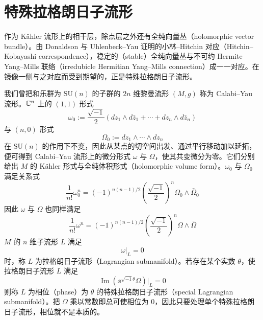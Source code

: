 \section{特殊拉格朗日子流形}

作为 Kähler 流形上的相干层，除点层之外还有全纯向量丛（holomorphic vector bundle）。由 Donaldson 与 Uhlenbeck--Yau 证明的小林--Hitchin 对应（Hitchin--Kobayashi correspondence），稳定的（stable）全纯向量丛与不可约 Hermite Yang--Mills 联络（irredubicle Hermitian Yang--Mills connection）成一一对应。在镜像一侧与之对应而受到期望的，正是特殊拉格朗日子流形。


我们曾把和乐群为 $\mathrm{SU}(n)$ 的子群的 $2n$ 维黎曼流形 $(M, g)$ 称为 Calabi--Yau 流形。$\mathbb{C}^n$ 上的 $(1, 1)$ 形式
\begin{equation}
\omega_0 := \frac{\sqrt{-1}}{2}\left(dz_1 \wedge d\bar z_1 + \cdots + dz_n \wedge d\bar z_n\right) \tag{20.1}
\end{equation}
与 $(n, 0)$ 形式
\begin{equation}
\Omega_0 := dz_1 \wedge \cdots \wedge dz_n \tag{20.2}
\end{equation}
在 $\mathrm{SU}(n)$ 的作用下不变，因此从某点的切空间出发、通过平行移动加以延拓，便可得到 Calabi--Yau 流形上的微分形式 $\omega$ 与 $\Omega$，使其共变微分为零。它们分别给出 $M$ 的 Kähler 形式与全纯体积形式（holomorphic volume form）。$\omega_0$ 与 $\Omega_0$ 满足关系式
\begin{equation}
\frac{1}{n!}\omega_0^{n} = (-1)^{n(n-1)/2}\left(\frac{\sqrt{-1}}{2}\right)^{n}\Omega_0 \wedge \bar\Omega_0 \tag{20.3}
\end{equation}
因此 $\omega$ 与 $\Omega$ 也同样满足
\begin{equation}
\frac{1}{n!}\omega^{n} = (-1)^{n(n-1)/2}\left(\frac{\sqrt{-1}}{2}\right)^{n}\Omega \wedge \bar\Omega \tag{20.4}
\end{equation}
$M$ 的 $n$ 维子流形 $L$ 满足
\begin{equation}
\omega|_{L} = 0 \tag{20.5}
\end{equation}
时，称 $L$ 为拉格朗日子流形（Lagrangian submanifold）。若存在某个实数 $\theta$，使拉格朗日子流形 $L$ 满足
\begin{equation}
\operatorname{Im}\left(\ee^{\sqrt{-1}\theta}\Omega\right)\Big|_{L} = 0 \tag{20.6}
\end{equation}
则称 $L$ 为相位（phase）为 $\theta$ 的特殊拉格朗日子流形（special Lagrangian submanifold）。把 $\Omega$ 乘以常数即总可使相位为 $0$，因此只要处理单个特殊拉格朗日子流形，相位就不是本质的。

